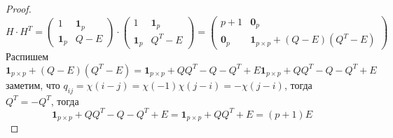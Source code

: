 \begin{proof}
$$H \cdot H^{T} = 
\begin{pmatrix} 1 & \mathbf{1}_p \\ \mathbf{1}_p & Q - E \end{pmatrix} \cdot
\begin{pmatrix} 1 & \mathbf{1}_p \\ \mathbf{1}_p & Q^{T} - E \end{pmatrix} =
\begin{pmatrix} p+1 & \mathbf{0}_p \\ \mathbf{0}_p & 
\mathbf{1}_{p \times p} + (Q-E)(Q^{T}-E) \end{pmatrix} $$
Распишем
$$\mathbf{1}_{p\times p} + (Q- E) (Q^{T}-E) = 
\mathbf{1}_{p\times p} + Q Q^{T} -Q - Q^{T} + E
\mathbf{1}_{p\times p} + Q Q^{T} -Q - Q^{T} + E$$
заметим, что $q_{ij} = \chi(i-j) = \chi(-1)\chi(j-i) = -\chi(j-i)$, тогда 
$Q^{T} = -Q^{T}$, тогда 
$$\mathbf{1}_{p\times p} + Q Q^{T} -Q - Q^{T} + E = 
  \mathbf{1}_{p\times p} + Q Q^{T} + E = (p+1) E$$
\end{proof}

